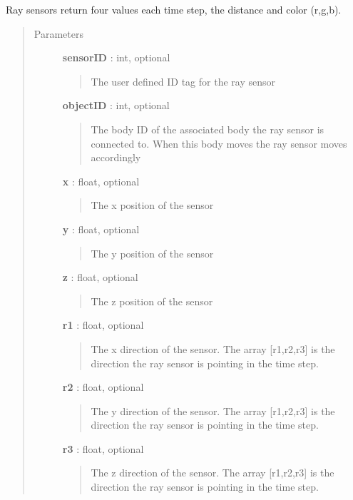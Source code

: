 \documentclass[letterpaper,10pt,english]{sphinxmanual}
\begin{document}
\begin{fulllineitems}
\begin{fulllineitems}
Ray sensors return four values each time step, the distance and color (r,g,b).
\begin{quote}\begin{description}
\item[{Parameters}] \leavevmode
\textbf{sensorID} : int, optional
\begin{quote}

The user defined ID tag for the ray sensor
\end{quote}

\textbf{objectID} : int, optional
\begin{quote}

The body ID of the associated body the ray sensor is connected to. When this
body moves the ray sensor moves accordingly
\end{quote}

\textbf{x} : float, optional
\begin{quote}

The x position of the sensor
\end{quote}

\textbf{y} : float, optional
\begin{quote}

The y position of the sensor
\end{quote}

\textbf{z} : float, optional
\begin{quote}

The z position of the sensor
\end{quote}

\textbf{r1} : float, optional
\begin{quote}

The x direction of the sensor. The array {[}r1,r2,r3{]} is the direction the
ray sensor is pointing in the time step.
\end{quote}

\textbf{r2} : float, optional
\begin{quote}

The y direction of the sensor. The array {[}r1,r2,r3{]} is the direction the
ray sensor is pointing in the time step.
\end{quote}

\textbf{r3} : float, optional
\begin{quote}

The z direction of the sensor. The array {[}r1,r2,r3{]} is the direction the
ray sensor is pointing in the time step.
\end{quote}


\end{description}
\end{quote}
\end{fulllineitems}
\end{fulllineitems}
\end{document}
